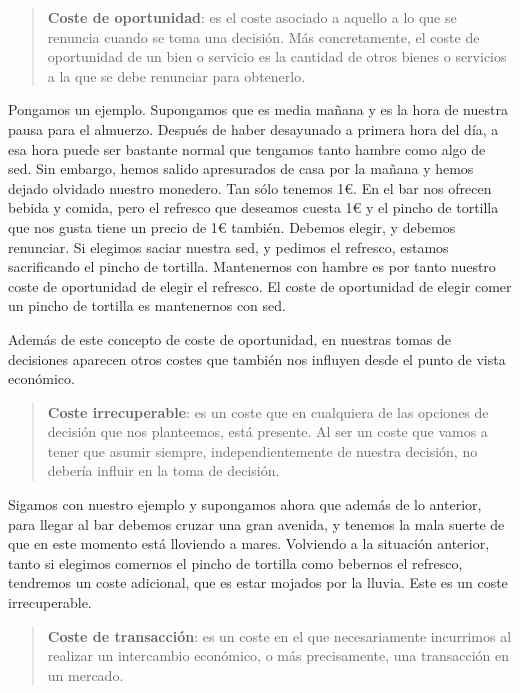\documentclass[
]{book}
\begin{document}
\begin{quote}
\textbf{Coste de oportunidad}: es el coste asociado a aquello a lo que se renuncia cuando se toma una decisión. Más concretamente, el coste de oportunidad de un bien o servicio es la cantidad de otros bienes o servicios a la que se debe renunciar para obtenerlo.
\end{quote}

Pongamos un ejemplo. Supongamos que es media mañana y es la hora de nuestra pausa para el almuerzo. Después de haber desayunado a primera hora del día, a esa hora puede ser bastante normal que tengamos tanto hambre como algo de sed. Sin embargo, hemos salido apresurados de casa por la mañana y hemos dejado olvidado nuestro monedero. Tan sólo tenemos 1€.
En el bar nos ofrecen bebida y comida, pero el refresco que deseamos cuesta 1€ y el pincho de tortilla que nos gusta tiene un precio de 1€ también. Debemos elegir, y debemos renunciar. Si elegimos saciar nuestra sed, y pedimos el refresco, estamos sacrificando el pincho de tortilla. Mantenernos con hambre es por tanto nuestro coste de oportunidad de elegir el refresco. El coste de oportunidad de elegir comer un pincho de tortilla es mantenernos con sed.

Además de este concepto de coste de oportunidad, en nuestras tomas de decisiones aparecen otros costes que también nos influyen desde el punto de vista económico.

\begin{quote}
\textbf{Coste irrecuperable}: es un coste que en cualquiera de las opciones de decisión que nos planteemos, está presente. Al ser un coste que vamos a tener que asumir siempre, independientemente de nuestra decisión, no debería influir en la toma de decisión.
\end{quote}

Sigamos con nuestro ejemplo y supongamos ahora que además de lo anterior, para llegar al bar debemos cruzar una gran avenida, y tenemos la mala suerte de que en este momento está lloviendo a mares. Volviendo a la situación anterior, tanto si elegimos comernos el pincho de tortilla como bebernos el refresco, tendremos un coste adicional, que es estar mojados por la lluvia. Este es un coste irrecuperable.

\begin{quote}
\textbf{Coste de transacción}: es un coste en el que necesariamente incurrimos al realizar un intercambio económico, o más precisamente, una transacción en un mercado.
\end{quote}
\end{document}
